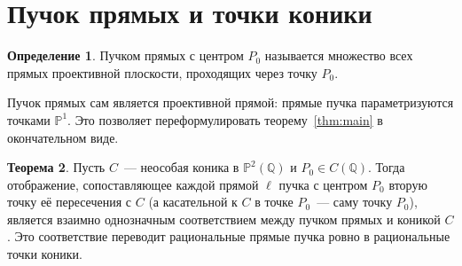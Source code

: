 \documentclass[a4paper,14pt]{extreport}
\theoremstyle{definition}
\newtheorem{thm}{Теорема}[chapter]
\newtheorem{defn}[thm]{Определение}
\newcommand{\Q}{\mathbb{Q}}
\newcommand{\PP}{\mathbb{P}}
\begin{document}
\section{Пучок прямых и точки коники}

\begin{defn}
Пучком прямых с центром $P_0$ называется множество всех прямых проективной
плоскости, проходящих через точку $P_0$.
\end{defn}

Пучок прямых сам является проективной прямой: прямые пучка параметризуются
точками $\PP^1$. Это позволяет переформулировать теорему~\ref{thm:main} в
окончательном виде.

\begin{thm}\label{thm:proj}
Пусть $C$~--- неособая коника в $\PP^2(\Q)$ и $P_0\in C(\Q)$. Тогда отображение,
сопоставляющее каждой прямой $\ell$ пучка с центром $P_0$ вторую точку её
пересечения с $C$ (а касательной к $C$ в точке $P_0$~--- саму точку $P_0$),
является взаимно однозначным соответствием между пучком прямых и коникой $C$.
Это соответствие переводит рациональные прямые пучка ровно в рациональные точки
коники.
\end{thm}
\end{document}
